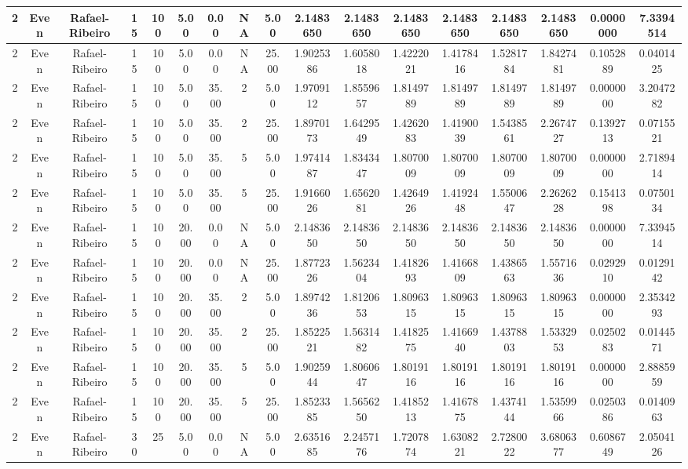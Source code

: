 \begin{longtable}{ | c | c | c | c | c | c | c | c | c | c | c | c | c | c | c | c | c | }
	\hline
	2	&	Even	&	Rafael-Ribeiro	&	15	&	100	&	5.00	&	0.00	&	NA	&	5.00	&	2.1483650	&	2.1483650	&	2.1483650	&	2.1483650	&	2.1483650	&	2.1483650	&	0.0000000	&	7.3394514 \\
	\hline
	2	&	Even	&	Rafael-Ribeiro	&	15	&	100	&	5.00	&	0.00	&	NA	&	25.00	&	1.9025386	&	1.6058018	&	1.4222021	&	1.4178416	&	1.5281784	&	1.8427481	&	0.1052889	&	0.0401425 \\
	\hline
	2	&	Even	&	Rafael-Ribeiro	&	15	&	100	&	5.00	&	35.00	&	2	&	5.00	&	1.9709112	&	1.8559657	&	1.8149789	&	1.8149789	&	1.8149789	&	1.8149789	&	0.0000000	&	3.2047282 \\
	\hline
	2	&	Even	&	Rafael-Ribeiro	&	15	&	100	&	5.00	&	35.00	&	2	&	25.00	&	1.8970173	&	1.6429549	&	1.4262083	&	1.4190039	&	1.5438561	&	2.2674727	&	0.1392713	&	0.0715521 \\
	\hline
	2	&	Even	&	Rafael-Ribeiro	&	15	&	100	&	5.00	&	35.00	&	5	&	5.00	&	1.9741487	&	1.8343447	&	1.8070009	&	1.8070009	&	1.8070009	&	1.8070009	&	0.0000000	&	2.7189414 \\
	\hline
	2	&	Even	&	Rafael-Ribeiro	&	15	&	100	&	5.00	&	35.00	&	5	&	25.00	&	1.9166026	&	1.6562081	&	1.4264926	&	1.4192448	&	1.5500647	&	2.2626228	&	0.1541398	&	0.0750134 \\
	\hline
	2	&	Even	&	Rafael-Ribeiro	&	15	&	100	&	20.00	&	0.00	&	NA	&	5.00	&	2.1483650	&	2.1483650	&	2.1483650	&	2.1483650	&	2.1483650	&	2.1483650	&	0.0000000	&	7.3394514 \\
	\hline
	2	&	Even	&	Rafael-Ribeiro	&	15	&	100	&	20.00	&	0.00	&	NA	&	25.00	&	1.8772326	&	1.5623404	&	1.4182693	&	1.4166809	&	1.4386563	&	1.5571636	&	0.0292910	&	0.0129142 \\
	\hline
	2	&	Even	&	Rafael-Ribeiro	&	15	&	100	&	20.00	&	35.00	&	2	&	5.00	&	1.8974236	&	1.8120653	&	1.8096315	&	1.8096315	&	1.8096315	&	1.8096315	&	0.0000000	&	2.3534293 \\
	\hline
	2	&	Even	&	Rafael-Ribeiro	&	15	&	100	&	20.00	&	35.00	&	2	&	25.00	&	1.8522521	&	1.5631482	&	1.4182575	&	1.4166940	&	1.4378803	&	1.5332953	&	0.0250283	&	0.0144571 \\
	\hline
	2	&	Even	&	Rafael-Ribeiro	&	15	&	100	&	20.00	&	35.00	&	5	&	5.00	&	1.9025944	&	1.8060647	&	1.8019116	&	1.8019116	&	1.8019116	&	1.8019116	&	0.0000000	&	2.8885959 \\
	\hline
	2	&	Even	&	Rafael-Ribeiro	&	15	&	100	&	20.00	&	35.00	&	5	&	25.00	&	1.8523385	&	1.5656250	&	1.4185213	&	1.4167875	&	1.4374144	&	1.5359966	&	0.0250386	&	0.0140963 \\
	\hline
	2	&	Even	&	Rafael-Ribeiro	&	30	&	25	&	5.00	&	0.00	&	NA	&	5.00	&	2.6351685	&	2.2457176	&	1.7207874	&	1.6308221	&	2.7280022	&	3.6806377	&	0.6086749	&	2.0504126 \\

\end{longtable}
